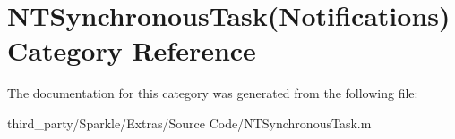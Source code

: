 \hypertarget{category_n_t_synchronous_task_07_notifications_08}{}\section{N\+T\+Synchronous\+Task(Notifications) Category Reference}
\label{category_n_t_synchronous_task_07_notifications_08}


The documentation for this category was generated from the following file\+:\begin{DoxyCompactItemize}
\item 
third\+\_\+party/\+Sparkle/\+Extras/\+Source Code/N\+T\+Synchronous\+Task.\+m\end{DoxyCompactItemize}
